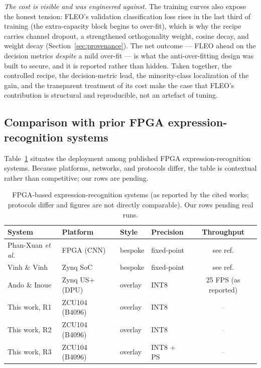 \documentclass[onecolumn,journal]{IEEEtran}
\newcommand{\tbd}{\textcolor{gray}{--}}
\begin{document}
\emph{The cost is visible and was engineered against.} The training curves also expose
the honest tension: FLEO's validation classification loss rises in the last third of
training (the extra-capacity block begins to over-fit), which is why the recipe carries
channel dropout, a strengthened orthogonality weight, cosine decay, and weight decay
(Section~\ref{sec:provenance}). The net outcome --- FLEO ahead on the decision metrics
\emph{despite} a mild over-fit --- is what the anti-over-fitting design was built to
secure, and it is reported rather than hidden. Taken together, the controlled recipe,
the decision-metric lead, the minority-class localization of the gain, and the
transparent treatment of its cost make the case that FLEO's contribution is structural
and reproducible, not an artefact of tuning.

\subsection{Comparison with prior FPGA expression-recognition systems}
Table~\ref{tab:priorwork} situates the deployment among published FPGA
expression-recognition systems. Because platforms, networks, and protocols differ,
the table is contextual rather than competitive; our rows are pending.

\begin{table}[t]
\centering
\caption{FPGA-based expression-recognition systems (as reported by the cited works;
protocols differ and figures are not directly comparable). Our rows pending real runs.}
\label{tab:priorwork}
\setlength{\tabcolsep}{4pt}
\renewcommand{\arraystretch}{1.25}
\begin{tabular}{llllc}
\toprule
System & Platform & Style & Precision & Throughput\\
\midrule
Phan-Xuan \textit{et al.} \cite{phanxuan2019fpga} & FPGA (CNN) & bespoke & fixed-point & see ref.\\
Vinh \& Vinh \cite{vinh2019soc} & Zynq SoC & bespoke & fixed-point & see ref.\\
Ando \& Inoue \cite{ando2025fer} & Zynq US+ (DPU) & overlay & INT8 & 25 FPS (as reported)\\
\midrule
This work, R1 & ZCU104 (B4096) & overlay & INT8 & \tbd\\
This work, R2 & ZCU104 (B4096) & overlay & INT8 & \tbd\\
This work, R3 & ZCU104 (B4096) & overlay & INT8 + PS & \tbd\\
\bottomrule
\end{tabular}
\end{table}
\end{document}
